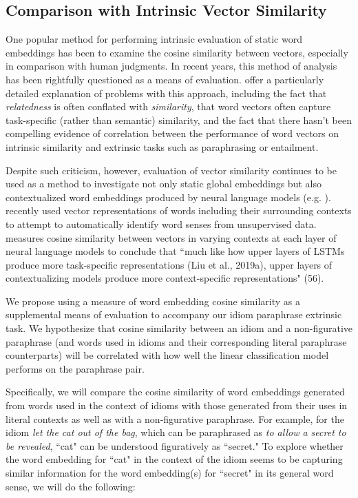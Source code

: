 \documentclass[11pt,a4paper]{article}
\begin{document}
\subsection{Comparison with Intrinsic Vector Similarity}

One popular method for performing intrinsic evaluation of static word embeddings has been to examine the cosine similarity between vectors, especially in comparison with human judgments. In recent years, this method of analysis has been rightfully questioned as a means of evaluation. \citet{faruqui-etal-2016-problems} offer a particularly detailed explanation of problems with this approach, including the fact that \textit{relatedness} is often conflated with \textit{similarity}, that word vectors often capture task-specific (rather than semantic) similarity, and the fact that there hasn't been compelling evidence of correlation between the performance of word vectors on intrinsic similarity and extrinsic tasks such as paraphrasing or entailment.

Despite such criticism, however, evaluation of vector similarity continues to be used as a method to investigate not only static global embeddings but also contextualized word embeddings produced by neural language models (e.g. \citet{van_Aken_2019}). \citet{huang_cho_bowman_2020} recently used vector representations of words including their surrounding contexts to attempt to automatically identify word senses from unsupervised data. \citet{ethayarajh2019contextual} measures cosine similarity between vectors in varying contexts at each layer of neural language models to conclude that  ``much like how upper layers of LSTMs produce more task-specific
representations (Liu et al., 2019a), upper layers of contextualizing models produce more context-specific representations" (56).

 We propose using a measure of word embedding cosine similarity as a supplemental means of evaluation to accompany our idiom paraphrase extrinsic task. We hypothesize that cosine similarity between an idiom and a non-figurative paraphrase (and words used in idioms and their corresponding literal paraphrase counterparts) will be correlated with how well the linear classification model performs on the paraphrase pair.
 
Specifically, we will compare the cosine similarity of word embeddings generated from words used in the context of idioms with those generated from their uses in literal contexts as well as with a non-figurative paraphrase. For example, for the idiom \textit{let the cat out of the bag}, which can be paraphrased as \textit{to allow a secret to be revealed}, ``cat" can be understood figuratively as ``secret." To explore whether the word embedding for ``cat" in the context of the idiom seems to be capturing similar information for the word embedding(s) for ``secret" in its general word sense, we will do the following:
 
\end{document}
